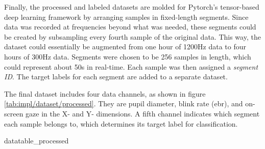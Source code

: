 Finally, the processed and labeled datasets are molded for Pytorch's tensor-based deep learning framework by arranging samples in fixed-length segments. Since data was recorded at frequencies beyond what was needed, these segments could be created by subsampling every fourth sample of the original data. This way, the dataset could essentially be augmented from one hour of 1200Hz data to four hours of 300Hz data. Segments were chosen to be 256 samples in length, which could represent about 50s in real-time. Each sample was then assigned a \textit{segment ID}. The target labels for each segment are added to a separate dataset.

The final dataset includes four data channels, as shown in figure \ref{tab:impl/dataset/processed}. They are pupil diameter, blink rate (\acrshort{ebr}), and on-screen gaze in the X- and Y- dimensions. A fifth channel indicates which segment each sample belongs to, which determines its target label for classification. 

{datatable_processed}




